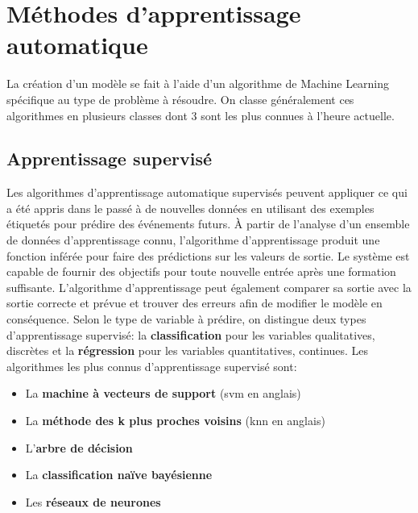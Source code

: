 \section{Méthodes d'apprentissage automatique}
La création d’un modèle se fait à l’aide d’un algorithme de Machine Learning spécifique au type de problème à résoudre.  On classe généralement ces algorithmes en plusieurs classes dont 3 sont les plus connues à l’heure actuelle.

    \subsection{Apprentissage supervisé}
    Les algorithmes d'apprentissage automatique supervisés peuvent appliquer ce qui a été appris dans le passé à de nouvelles données en utilisant des exemples étiquetés pour prédire des événements futurs. À partir de l'analyse d'un ensemble de données d'apprentissage connu, l'algorithme d'apprentissage produit une fonction inférée pour faire des prédictions sur les valeurs de sortie. Le système est capable de fournir des objectifs pour toute nouvelle entrée après une formation suffisante. L'algorithme d'apprentissage peut également comparer sa sortie avec la sortie correcte et prévue et trouver des erreurs afin de modifier le modèle en conséquence.\cite{expertAi}
    Selon le type de variable à prédire, on distingue deux types d’apprentissage supervisé: la \textbf{classification} pour les variables qualitatives, discrètes et la \textbf{régression} pour les variables quantitatives, continues.
    Les algorithmes les plus connus d’apprentissage supervisé sont:
    \begin{itemize}
        \item La \textbf{machine à vecteurs de support} (\acrshort{svm} en anglais)
        \item La \textbf{méthode des k plus proches voisins} (\acrshort{knn} en anglais)
        \item L'\textbf{arbre de décision}
        \item La \textbf{classification naïve bayésienne}
        \item Les \textbf{réseaux de neurones}
    \end{itemize}

